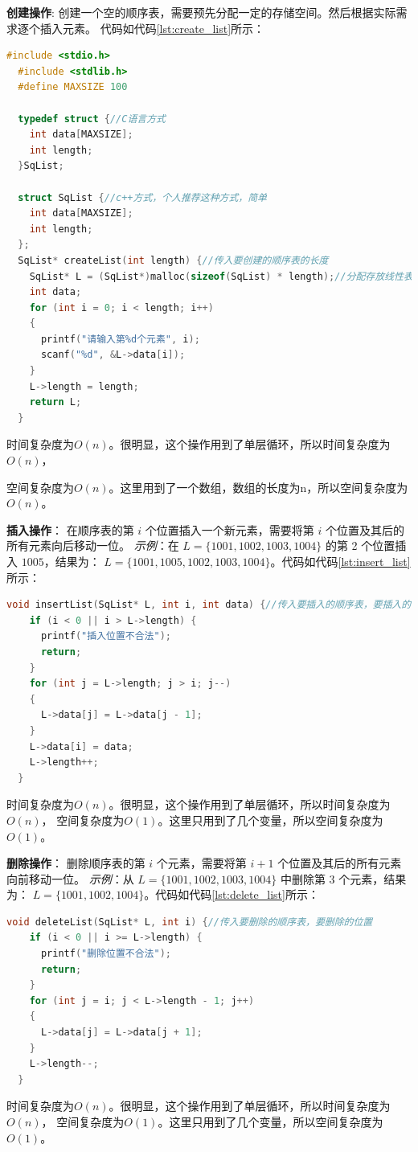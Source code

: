 \documentclass[lang=cn,newtx,10pt,scheme=chinese]{../elegantbook}
\begin{document}
\textbf{创建操作}:
创建一个空的顺序表，需要预先分配一定的存储空间。然后根据实际需求逐个插入元素。
代码如代码\ref{lst:create_list}所示：
\begin{lstlisting}[language=C++, caption={顺序表的创建示例代码}, label={lst:create_list}]
  #include <stdio.h>
  #include <stdlib.h>
  #define MAXSIZE 100

  typedef struct {//C语言方式
    int data[MAXSIZE];
    int length;
  }SqList;

  struct SqList {//c++方式，个人推荐这种方式，简单
    int data[MAXSIZE];
    int length;
  };
  SqList* createList(int length) {//传入要创建的顺序表的长度
    SqList* L = (SqList*)malloc(sizeof(SqList) * length);//分配存放线性表的空间
    int data;
    for (int i = 0; i < length; i++)
    {
      printf("请输入第%d个元素", i);
      scanf("%d", &L->data[i]);
    }
    L->length = length;
    return L;
  }
  \end{lstlisting}

时间复杂度为$O(n)$。很明显，这个操作用到了单层循环，所以时间复杂度为$O(n)$，

空间复杂度为$O(n)$。这里用到了一个数组，数组的长度为n，所以空间复杂度为$O(n)$。

\textbf{插入操作}：
在顺序表的第 $i$ 个位置插入一个新元素，需要将第 $i$ 个位置及其后的所有元素向后移动一位。
\textit{示例}：在 $L = \{1001, 1002, 1003, 1004\}$ 的第 2 个位置插入 $1005$，结果为：
$L = \{1001, 1005, 1002, 1003, 1004\}$。代码如代码\ref{lst:insert_list}所示：
\begin{lstlisting}[language=C++, caption={顺序表的插入示例代码}, label={lst:insert_list}]
  void insertList(SqList* L, int i, int data) {//传入要插入的顺序表，要插入的位置，要插入的数据
    if (i < 0 || i > L->length) {
      printf("插入位置不合法");
      return;
    }
    for (int j = L->length; j > i; j--)
    {
      L->data[j] = L->data[j - 1];
    }
    L->data[i] = data;
    L->length++;
  }
  \end{lstlisting}
时间复杂度为$O(n)$。很明显，这个操作用到了单层循环，所以时间复杂度为$O(n)$，
空间复杂度为$O(1)$。这里只用到了几个变量，所以空间复杂度为$O(1)$。



\textbf{删除操作}：
删除顺序表的第 $i$ 个元素，需要将第 $i+1$ 个位置及其后的所有元素向前移动一位。
\textit{示例}：从 $L = \{1001, 1002, 1003, 1004\}$ 中删除第 3 个元素，结果为：
$L = \{1001, 1002, 1004\}$。代码如代码\ref{lst:delete_list}所示：
\begin{lstlisting}[language=C++, caption={顺序表的删除示例代码}, label={lst:delete_list}]
  void deleteList(SqList* L, int i) {//传入要删除的顺序表，要删除的位置
    if (i < 0 || i >= L->length) {
      printf("删除位置不合法");
      return;
    }
    for (int j = i; j < L->length - 1; j++)
    {
      L->data[j] = L->data[j + 1];
    }
    L->length--;
  }
  \end{lstlisting}
时间复杂度为$O(n)$。很明显，这个操作用到了单层循环，所以时间复杂度为$O(n)$，
空间复杂度为$O(1)$。这里只用到了几个变量，所以空间复杂度为$O(1)$。
\end{document}
